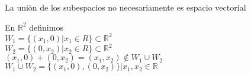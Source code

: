\begin{observacion}
 		La uni\`on de los subespacios no necesariamente es espacio vectorial

\end{observacion}

\begin{ejemplo}
	 En $\mathbb{R}^2 $ definimos \\ $W_1 = \{ ( x_1 , 0 ) | x_1 \in R \} \subset \mathbb{R}^2$ \\ $W_2 = \{ ( 0,x_2 ) | x_2 \in R \} \subset \mathbb{R}^2 $ \\ $(x_1,0)+(0,x_2)= (x_1 , x_2) \notin W_1 \cup W_2$ \\ $W_1 \cup W_2 = \{ ( x_1 , 0 ),( 0,x_2 ) \} | x_1 , x_2 \in \mathbb{R}$
\end{ejemplo}
